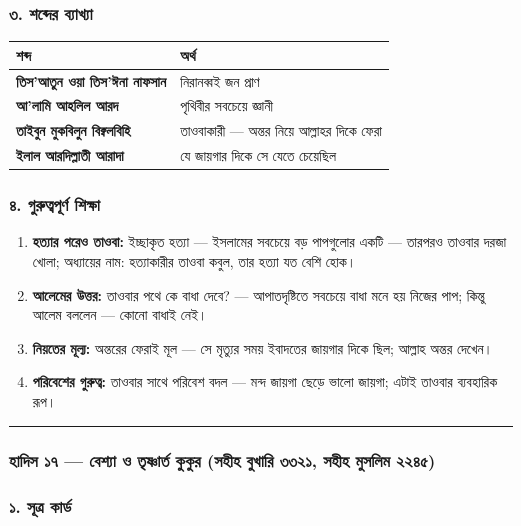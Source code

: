 \subsubsection*{৩. শব্দের ব্যাখ্যা}

\begin{table}[h]\centering\small
\begin{tabular}{ll}
শব্দ & অর্থ \\
\hline
\textbf{তিস'আতুন ওয়া তিস'ঈনা নাফসান} & নিরানব্বই জন প্রাণ \\
\textbf{আ'লামি আহলিল আরদ} & পৃথিবীর সবচেয়ে জ্ঞানী \\
\textbf{তাইবুন মুকবিলুন বিক্বলবিহি} & তাওবাকারী — অন্তর নিয়ে আল্লাহর দিকে ফেরা \\
\textbf{ইলাল আরদিল্লাতী আরাদা} & যে জায়গার দিকে সে যেতে চেয়েছিল \\
\hline
\end{tabular}
\end{table}

\subsubsection*{৪. গুরুত্বপূর্ণ শিক্ষা}

\begin{enumerate}
\item \textbf{হত্যার পরেও তাওবা:} ইচ্ছাকৃত হত্যা — ইসলামের সবচেয়ে বড় পাপগুলোর একটি — তারপরও তাওবার দরজা খোলা; অধ্যায়ের নাম: হত্যাকারীর তাওবা কবুল, তার হত্যা যত বেশি হোক।
\item \textbf{আলেমের উত্তর:} তাওবার পথে কে বাধা দেবে? — আপাতদৃষ্টিতে সবচেয়ে বাধা মনে হয় নিজের পাপ; কিন্তু আলেম বললেন — কোনো বাধাই নেই।
\item \textbf{নিয়তের মূল্য:} অন্তরের ফেরাই মূল — সে মৃত্যুর সময় ইবাদতের জায়গার দিকে ছিল; আল্লাহ অন্তর দেখেন।
\item \textbf{পরিবেশের গুরুত্ব:} তাওবার সাথে পরিবেশ বদল — মন্দ জায়গা ছেড়ে ভালো জায়গা; এটাই তাওবার ব্যবহারিক রূপ।
\end{enumerate}
\medskip\hrule\medskip

\subsubsection*{হাদিস ১৭ — বেশ্যা ও তৃষ্ণার্ত কুকুর (সহীহ বুখারি ৩৩২১, সহীহ মুসলিম ২২৪৫)}

\subsubsection*{১. সূত্র কার্ড}

